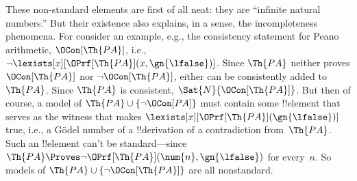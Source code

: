 \documentclass[../../../include/open-logic-section]{subfiles}
\begin{document}
These non-standard elements are first of all neat: they are ``infinite
natural numbers.'' But their existence also explains, in a sense, the
incompleteness phenomena.  For consider an example, e.g., the
consistency statement for Peano arithmetic, $\OCon[\Th{PA}]$, i.e.,
$\lnot \lexists[x][\OPrf[\Th{PA}](x, \gn{\lfalse})]$. Since $\Th{PA}$
neither proves $\OCon[\Th{PA}]$ nor $\lnot \OCon[\Th{PA}]$, either can
be consistently added to $\Th{PA}$. Since $\Th{PA}$ is consistent,
$\Sat{N}{\OCon[\Th{PA}]}$.  But then of course, a model of $\Th{PA}
\cup \{\lnot \OCon[PA]\}$ must contain some !!{element} that serves as
the witness that makes $\lexists[x][\OPrf[\Th{PA}](\gn{\lfalse})]$
true, i.e., a G\"odel number of a !!{derivation} of a contradiction
from~$\Th{PA}$.  Such an !!{element} can't be standard---since
$\Th{PA} \Proves \lnot \OPrf[\Th{PA}](\num{n}, \gn{\lfalse})$ for
every~$n$.  So models of $\Th{PA} \cup \{\lnot \OCon[\Th{PA}]\}$ are
all nonstandard.
\end{document}
